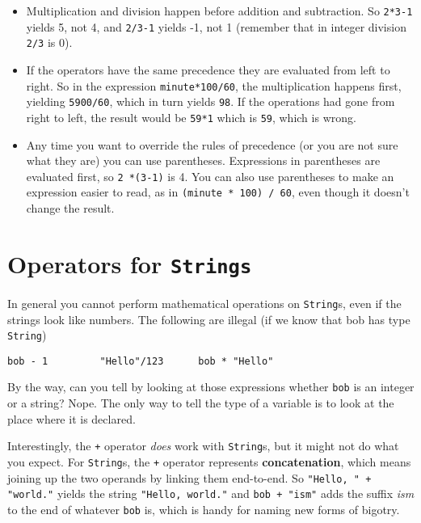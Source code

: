 \documentclass[12pt]{book}
\theoremstyle{definition}
\begin{document}
\begin{itemize}

\item Multiplication and division happen before
addition and subtraction.  So {\tt 2*3-1} yields 5, not 4, and
{\tt 2/3-1} yields -1, not 1 (remember that in integer division
{\tt 2/3} is 0).

\item If the operators have the same precedence they are evaluated
from left to right.  So in the expression {\tt minute*100/60},
the multiplication happens first, yielding {\tt 5900/60}, which
in turn yields {\tt 98}.  If the operations had gone from right
to left, the result would be {\tt 59*1} which is {\tt 59}, which
is wrong.

\item Any time you want to override the rules of precedence (or
you are not sure what they are) you can use parentheses.  Expressions
in parentheses are evaluated first, so {\tt 2 *(3-1)} is 4.
You can also use parentheses to make an expression easier to
read, as in {\tt(minute * 100) / 60}, even though it doesn't
change the result.

\end{itemize}


\section{Operators for {\tt Strings}}

In general you cannot perform mathematical operations on {\tt String}s,
even if the strings look like numbers.  The following are
illegal (if we know that bob has type {\tt String})

\begin{lstlisting}
bob - 1         "Hello"/123      bob * "Hello"
\end{lstlisting}
%
By the way, can you tell by looking at those expressions
whether {\tt bob} is an integer or a string?  Nope.
The only way to tell the type of a variable is to look at
the place where it is declared.


Interestingly, the {\tt +} operator {\em does} work with
{\tt String}s, but it might not do what you expect.
For {\tt String}s, the {\tt +} operator represents {\bf concatenation},
which means joining up the two operands by linking them
end-to-end.  So {\tt "Hello, " + "world."} yields the string
{\tt "Hello, world."} and {\tt bob + "ism"} adds the suffix
{\em ism} to the end of whatever {\tt bob} is, which is
handy for naming new forms of bigotry.
\end{document}
